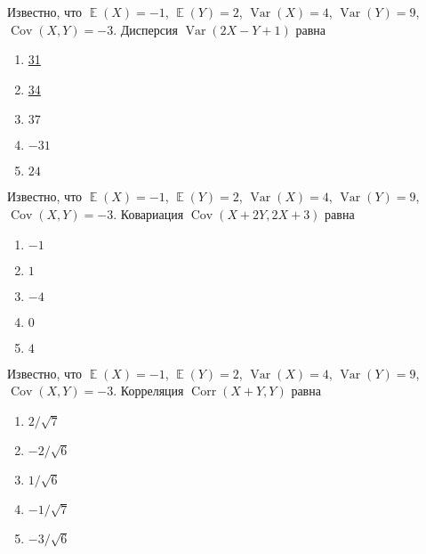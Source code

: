 \documentclass[t]{beamer}
\DeclareMathOperator{\Var}{Var}
\DeclareMathOperator{\Cov}{Cov}
\DeclareMathOperator{\Corr}{Corr}
\DeclareMathOperator{\E}{\mathbb{E}}
\begin{document}
 \begin{frame} \label{19} 
\begin{block}{19} 

Известно, что $\E(X)=-1$, $\E(Y)=2$, $\Var(X)=4$, $\Var(Y)=9$, $\Cov(X,Y)=-3$. Дисперсия $\Var(2X-Y+1)$ равна


 \end{block} 
\begin{enumerate} 
\item[] \hyperlink{19-No}{\beamergotobutton{} 31}
\item[] \hyperlink{19-No}{\beamergotobutton{} 34}
\item[] \hyperlink{19-Yes}{\beamergotobutton{} $37$}
\item[] \hyperlink{19-No}{\beamergotobutton{} $-31$}
\item[] \hyperlink{19-No}{\beamergotobutton{} $24$}
\end{enumerate} 
\end{frame} 


 \begin{frame} \label{20} 
\begin{block}{20} 

Известно, что $\E(X)=-1$, $\E(Y)=2$, $\Var(X)=4$, $\Var(Y)=9$, $\Cov(X,Y)=-3$. Ковариация $\Cov(X+2Y, 2X+3)$ равна


 \end{block} 
\begin{enumerate} 
\item[] \hyperlink{20-No}{\beamergotobutton{}  $-1$ }
\item[] \hyperlink{20-No}{\beamergotobutton{}  $1$ }
\item[] \hyperlink{20-Yes}{\beamergotobutton{}  $-4$ }
\item[] \hyperlink{20-No}{\beamergotobutton{}  $0$ }
\item[] \hyperlink{20-No}{\beamergotobutton{}  $4$ }
\end{enumerate} 
\end{frame} 


 \begin{frame} \label{21} 
\begin{block}{21} 

Известно, что $\E(X)=-1$, $\E(Y)=2$, $\Var(X)=4$, $\Var(Y)=9$, $\Cov(X,Y)=-3$. Корреляция $\Corr(X+Y, Y)$ равна


 \end{block} 
\begin{enumerate} 
\item[] \hyperlink{21-Yes}{\beamergotobutton{}  $2/\sqrt7$ }
\item[] \hyperlink{21-No}{\beamergotobutton{}  $-2/\sqrt6$ }
\item[] \hyperlink{21-No}{\beamergotobutton{}  $1/\sqrt6$  }
\item[] \hyperlink{21-No}{\beamergotobutton{}  $-1/\sqrt7 $ }
\item[] \hyperlink{21-No}{\beamergotobutton{}  $-3/\sqrt6$ }
\end{enumerate} 
\end{frame} 
\end{document}
